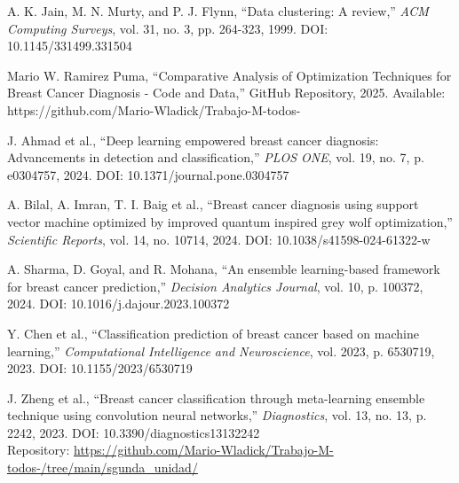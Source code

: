 \documentclass[conference]{IEEEtran}
\begin{document}
\begin{thebibliography}{00}
 A. K. Jain, M. N. Murty, and P. J. Flynn, ``Data clustering: A review,'' \textit{ACM Computing Surveys}, vol. 31, no. 3, pp. 264-323, 1999. DOI: 10.1145/331499.331504

 Mario W. Ramirez Puma, ``Comparative Analysis of Optimization Techniques for Breast Cancer Diagnosis - Code and Data,'' GitHub Repository, 2025. Available: https://github.com/Mario-Wladick/Trabajo-M-todos-

 J. Ahmad et al., ``Deep learning empowered breast cancer diagnosis: Advancements in detection and classification,'' \textit{PLOS ONE}, vol. 19, no. 7, p. e0304757, 2024. DOI: 10.1371/journal.pone.0304757

 A. Bilal, A. Imran, T. I. Baig et al., ``Breast cancer diagnosis using support vector machine optimized by improved quantum inspired grey wolf optimization,'' \textit{Scientific Reports}, vol. 14, no. 10714, 2024. DOI: 10.1038/s41598-024-61322-w

 A. Sharma, D. Goyal, and R. Mohana, ``An ensemble learning-based framework for breast cancer prediction,'' \textit{Decision Analytics Journal}, vol. 10, p. 100372, 2024. DOI: 10.1016/j.dajour.2023.100372

 Y. Chen et al., ``Classification prediction of breast cancer based on machine learning,'' \textit{Computational Intelligence and Neuroscience}, vol. 2023, p. 6530719, 2023. DOI: 10.1155/2023/6530719

 J. Zheng et al., ``Breast cancer classification through meta-learning ensemble technique using convolution neural networks,'' \textit{Diagnostics}, vol. 13, no. 13, p. 2242, 2023. DOI: 10.3390/diagnostics13132242
\\

Repository: \url{https://github.com/Mario-Wladick/Trabajo-M-todos-/tree/main/sgunda_unidad/}

\end{thebibliography}
\end{document}
